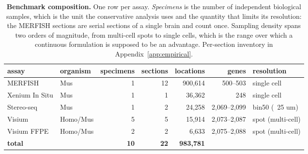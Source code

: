 \begin{table}[htbp]
\centering
\footnotesize
\setlength{\tabcolsep}{3pt}
\caption{\textbf{Benchmark composition.} One row per assay. \emph{Specimens} is the number of independent biological samples, which is the unit the conservative analysis uses and the quantity that limits its resolution: the MERFISH sections are serial sections of a single brain and count once. Sampling density spans two orders of magnitude, from multi-cell spots to single cells, which is the range over which a continuous formulation is supposed to be an advantage. Per-section inventory in Appendix~\ref{app:empirical}.}
\label{tab:data}
\begin{tabular}{llrrrrl}
\toprule
assay & organism & specimens & sections & locations & genes & resolution\\
\midrule
MERFISH & Mus & 1 & 12 & 900,614 & 500--503 & single cell \\
Xenium In Situ & Mus & 1 & 1 & 36,362 & 248 & single cell \\
Stereo-seq & Mus & 1 & 2 & 24,258 & 2,069--2,099 & bin50 (~25 um) \\
Visium & Homo/Mus & 5 & 5 & 15,914 & 2,073--2,087 & spot (multi-cell) \\
Visium FFPE & Homo/Mus & 2 & 2 & 6,633 & 2,075--2,088 & spot (multi-cell) \\
\midrule
\textbf{total} & & \textbf{10} & \textbf{22} & \textbf{983,781} & & \\
\bottomrule
\end{tabular}
\end{table}
